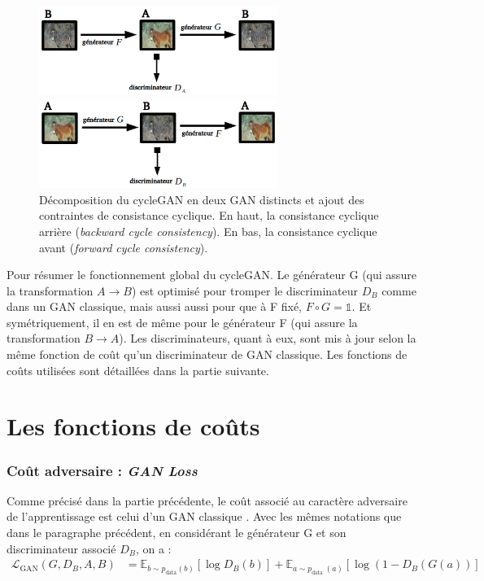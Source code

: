 \begin{figure}[!h]
\centering
\includegraphics[width=220pt]{"images/cycleBack"}

\vspace{6mm}

\includegraphics[width=220pt]{"images/cycleFor"}
\caption{Décomposition du cycleGAN en deux GAN distincts et ajout des contraintes de consistance cyclique. En haut, la consistance cyclique arrière (\textit{backward cycle consistency}). En bas, la consistance cyclique avant (\textit{forward cycle consistency}).}
\label{cycleForBack}
\end{figure}

Pour résumer le fonctionnement global du cycleGAN. Le générateur G (qui assure la transformation $ A \rightarrow B $) est optimisé pour tromper le discriminateur $ D_B $ comme dans un GAN classique, mais aussi aussi pour que à F fixé, $ F \circ G = \mathbb{1} $. Et symétriquement, il en est de même pour le générateur F (qui assure la transformation $ B \rightarrow A $). Les discriminateurs, quant à eux, sont mis à jour selon la même fonction de coût qu'un discriminateur de GAN classique. Les fonctions de coûts utilisées sont détaillées dans la partie suivante.


\section{Les fonctions de coûts}

\subsubsection{Coût adversaire : \textit{GAN Loss}}

Comme précisé dans la partie précédente, le coût associé au caractère adversaire de l'apprentissage est celui d'un GAN classique \cite{goodfellow_nips_2016}. Avec les mêmes notations que dans le paragraphe précédent, en considérant le générateur G et son discriminateur associé $D_B$, on a :
$$\begin{aligned}
\mathcal{L}_{\mathrm{GAN}}\left(G, D_{B}, A, B\right) &=\mathbb{E}_{b \sim p_{\mathrm{data}}(b)}\left[\log D_{B}(b)\right] +\mathbb{E}_{a \sim p_{\text {data }}(a)}\left[\log \left(1-D_{B}(G(a))\right]\right.
\end{aligned}$$

